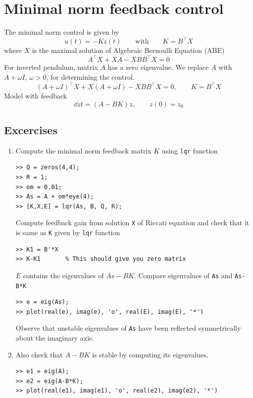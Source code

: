 \documentclass[12pt]{article}
\begin{document}
\section{Minimal norm feedback control}
The minimal norm control is given by
\[
u(t) = - K z (t) \qquad\mbox{with}\qquad K = B^\top X
\]
where $X$ is the maximal solution of Algebraic Bernoulli Equation (ABE)
\[
A^\top X + X A - X B B^\top X = 0
\]
For inverted pendulum, matrix $A$ has a zero eigenvalue. We replace $A$ with $A+\omega I$, $\omega > 0$, for determining the control.
\[
(A+\omega I)^\top X + X (A+\omega I) - X B B^\top X = 0, \qquad K = B^\top X
\]
Model with feedback
\[
\dd{z}{t} = (A - BK)z, \qquad z(0) = z_0
\]
\subsection{Excercises}

\begin{enumerate}

\item Compute the minimal norm feedback matrix $K$ using {\tt lqr} function
\begin{lstlisting}
>> Q = zeros(4,4);
>> R = 1;
>> om = 0.01;
>> As = A + om*eye(4);
>> [K,X,E] = lqr(As, B, Q, R);
\end{lstlisting}
Compute feedback gain from solution {\tt X} of Riccati equation and check that it is same as {\tt K} given by {\tt lqr} function
\begin{lstlisting}
>> K1 = B'*X
>> K-K1       % This should give you zero matrix
\end{lstlisting}
$E$ contains the eigenvalues of $As - B K$. Compare eigenvalues of {\tt As} and {\tt As-B*K}
\begin{lstlisting}
>> e = eig(As);
>> plot(real(e), imag(e), 'o', real(E), imag(E), '*')
\end{lstlisting}
Observe that unstable eigenvalues of {\tt As} have been reflected symmetrically about the imaginary axis.

\item Also check that $A-BK$ is stable by computing its eigenvalues.
\begin{lstlisting}
>> e1 = eig(A);
>> e2 = eig(A-B*K);
>> plot(real(e1), imag(e1), 'o', real(e2), imag(e2), '*')
\end{lstlisting}

\end{enumerate}
\end{document}
